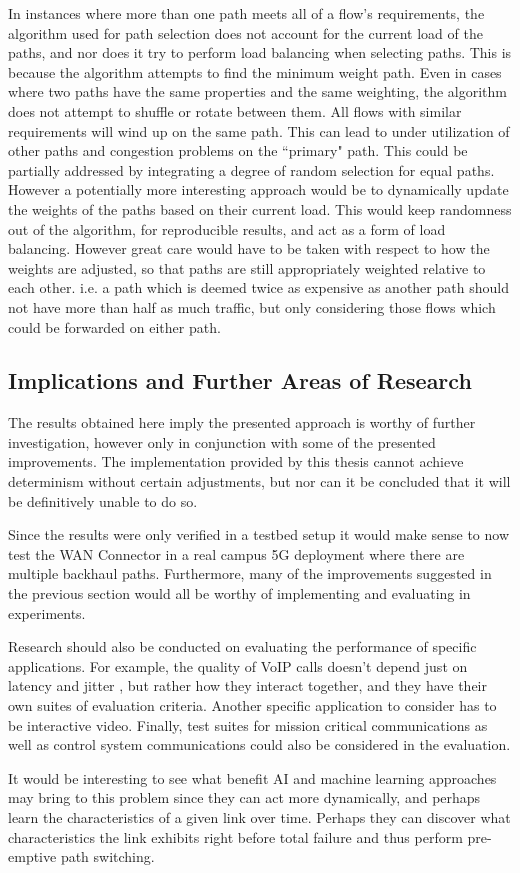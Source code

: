 In instances where more than one path meets all of a flow's requirements, the algorithm used for path selection does not account for the current load of the paths, and nor does it try to perform load balancing when selecting paths. This is because the algorithm attempts to find the minimum weight path. Even in cases where two paths have the same properties and the same weighting, the algorithm does not attempt to shuffle or rotate between them. All flows with similar requirements will wind up on the same path. This can lead to under utilization of other paths and congestion problems on the “primary" path. This could be partially addressed by integrating a degree of random selection for equal paths. However a potentially more interesting approach would be to dynamically update the weights of the paths based on their current load. This would keep randomness out of the algorithm, for reproducible results, and act as a form of load balancing. However great care would have to be taken with respect to how the weights are adjusted, so that paths are still appropriately weighted relative to each other. i.e. a path which is deemed twice as expensive as another path should not have more than half as much traffic, but only considering those flows which could be forwarded on either path.


\subsection{Implications and Further Areas of Research}

The results obtained here imply the presented approach is worthy of further investigation, however only in conjunction with some of the presented improvements. The implementation provided by this thesis cannot achieve determinism without certain adjustments, but nor can it be concluded that it will be definitively unable to do so.

Since the results were only verified in a testbed setup it would make sense to now test the WAN Connector in a real campus 5G deployment where there are multiple backhaul paths. Furthermore, many of the improvements suggested in the previous section would all be worthy of implementing and evaluating in experiments.

Research should also be conducted on evaluating the performance of specific applications. For example, the quality of VoIP calls doesn't depend just on latency and jitter \cite{tao2005improving}, but rather how they interact together, and they have their own suites of evaluation criteria. Another specific application to consider has to be interactive video. Finally, test suites for mission critical communications as well as control system communications could also be considered in the evaluation.

It would be interesting to see what benefit AI and machine learning approaches may bring to this problem since they can act more dynamically, and perhaps learn the characteristics of a given link over time. Perhaps they can discover what characteristics the link exhibits right before total failure and thus perform pre-emptive path switching.
